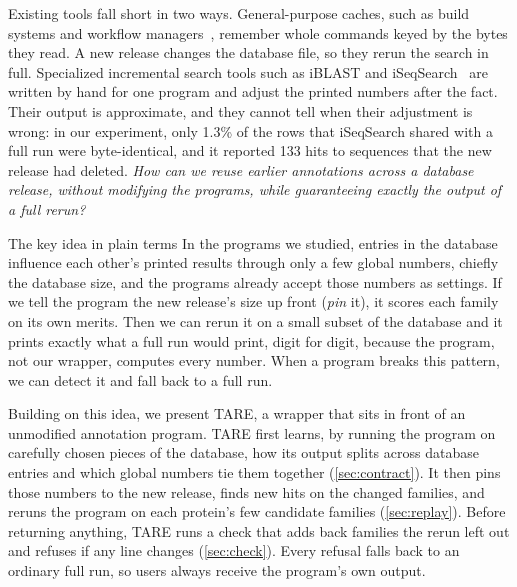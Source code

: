 \documentclass[letterpaper,twocolumn,10pt]{article}
\theoremstyle{definition}
\newcommand{\sys}{TARE\xspace}
\begin{document}
Existing tools fall short in two ways. General-purpose caches, such as build systems and workflow
managers~\cite{curtsinger2022riker,xie2026incr,shiptoski2023processcache,ditommaso2017nextflow,molder2021snakemake},
remember whole commands keyed by the bytes they read. A new release changes the database file, so they rerun the
search in full. Specialized incremental search tools such as iBLAST and iSeqSearch~\cite{dash2021iblast,yoo2025iseqsearch}
are written by hand for one program and adjust the printed numbers after the fact. Their output is approximate, and
they cannot tell when their adjustment is wrong: in our experiment, only 1.3\% of the rows that iSeqSearch shared
with a full run were byte-identical, and it reported 133 hits to sequences that the new release had deleted.
\textit{How can we reuse earlier annotations across a database release, without modifying the programs, while
guaranteeing exactly the output of a full rerun?}

\begin{plainbox}{The key idea in plain terms}
In the programs we studied, entries in the database influence each other's printed results through only a few
global numbers, chiefly the database size, and the programs already accept those numbers as settings. If we tell
the program the new release's size up front (\textit{pin} it), it scores each family on its own merits. Then we can
rerun it on a small subset of the database and it prints exactly what a full run would print, digit for digit,
because the program, not our wrapper, computes every number. When a program breaks this pattern, we can detect it
and fall back to a full run.
\end{plainbox}

Building on this idea, we present \sys, a wrapper that sits in front of an unmodified annotation program. \sys
first learns, by running the program on carefully chosen pieces of the database, how its output splits across
database entries and which global numbers tie them together (\cref{sec:contract}). It then pins those numbers to the
new release, finds new hits on the changed families, and reruns the program on each protein's few candidate families
(\cref{sec:replay}). Before returning anything, \sys runs a check that adds back families the rerun left out and
refuses if any line changes (\cref{sec:check}). Every refusal falls back to an ordinary full run, so users always
receive the program's own output.
\end{document}

